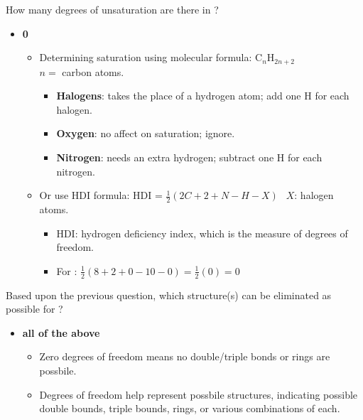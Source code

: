 \documentclass[12pt,a4paper]{article}
\begin{document}
\begin{enumerate}
    {\color{G-Moon}\item How many degrees of unsaturation are there in ?}
        \begin{itemize}
            \item {\color{o-Sun}\textbf{0}}
                \begin{itemize}
                    \item Determining saturation using molecular formula: {\color{o-Sun}C\(_{n}\)H\(_{2n+2}\)}\\\(n=\) carbon atoms.
                        \begin{itemize}
                            \item \textbf{Halogens}: takes the place of a hydrogen atom; {\color{o-Sun}add one H} for each halogen.
                            \item \textbf{Oxygen}: no affect on saturation; {\color{o-Sun}ignore}.
                            \item \textbf{Nitrogen}: needs an extra hydrogen; {\color{o-Sun}subtract one H} for each nitrogen. 
                        \end{itemize}
                    \item Or use HDI formula: {\color{o-Sun}HDI = \(\frac{1}{2}(2C + 2 + N - H - X)~~\)} \(X\): halogen atoms.
                        \begin{itemize}
                            \item HDI: hydrogen deficiency index, which is the measure of degrees of freedom.
                            \item For :  \(\frac{1}{2}(8 + 2 + 0 - 10 - 0) = \frac{1}{2}(0) = 0\) 
                        \end{itemize}
                \end{itemize}
        \end{itemize}
    \newpage
    {\color{G-Moon}\item Based upon the previous question, which structure(s) can be eliminated as possible for ?}
        \begin{itemize}
            \item {\color{o-Sun}\textbf{all of the above}}
                \begin{itemize}
                    \item {\color{o-Sun}Zero degrees of freedom} means {\color{false}no double/triple bonds or rings} are possbile.
                    \item Degrees of freedom help represent possbile structures, indicating possible double bounds, triple bounds, rings, or various combinations of each.

\end{itemize}
\end{itemize}
\end{enumerate}
\end{document}
